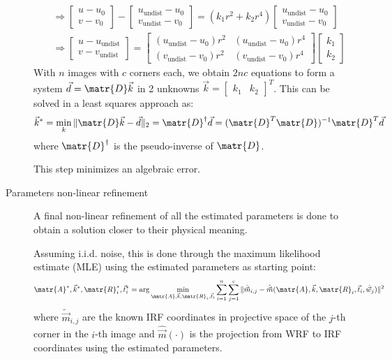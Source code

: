 \begin{description}
\[\begin{split}
                &\Rightarrow \begin{bmatrix} u-u_0 \\ v-v_0 \end{bmatrix} - \begin{bmatrix} u_\text{undist}-u_0 \\ v_\text{undist}-v_0 \end{bmatrix} = 
                    (k_1r^2 + k_2r^4) \begin{bmatrix} u_\text{undist}-u_0 \\ v_\text{undist}-v_0 \end{bmatrix} \\
                &\Rightarrow \begin{bmatrix} u-u_\text{undist} \\ v-v_\text{undist} \end{bmatrix} = 
                    \begin{bmatrix}
                        (u_\text{undist} - u_0)r^2 & (u_\text{undist} - u_0)r^4 \\
                        (v_\text{undist} - v_0)r^2 & (v_\text{undist} - v_0)r^4
                    \end{bmatrix}
                    \begin{bmatrix} k_1 \\ k_2 \end{bmatrix}
            \end{split}
        \]
        With $n$ images with $c$ corners each, we obtain $2nc$ equations 
        to form a system $\vec{d} = \matr{D} \vec{k}$ in 2 unknowns $\vec{k} = \begin{bmatrix} k_1 & k_2\end{bmatrix}^T$.
        This can be solved in a least squares approach as:
        \[ \vec{k}^*  = \min_k \Vert \matr{D}\vec{k} - \vec{d} \Vert_2 = \matr{D}^\dagger \vec{d} = (\matr{D}^T\matr{D})^{-1} \matr{D}^T \vec{d} \]
        where $\matr{D}^\dagger$ is the pseudo-inverse of $\matr{D}$.

        \begin{remark}
            This step minimizes an algebraic error.
        \end{remark}

    \item[Parameters non-linear refinement]
        A final non-linear refinement of all the estimated parameters is done to obtain a solution closer to their physical meaning.

        Assuming i.i.d. noise, this is done through the maximum likelihood estimate (MLE) using the estimated parameters as starting point:
        \[ 
            \matr{A}^*, \vec{k}^*, \matr{R}_i^*, \vec{t}_i^* = 
                \arg\min_{\matr{A}, \vec{k}, \matr{R}_i, \vec{t}_i} \sum_{i=1}^n \sum_{j=1}^c 
                    \Vert \tilde{\vec{m}}_{i,j} - \hat{\vec{m}}(\matr{A}, \vec{k}, \matr{R}_i, \vec{t}_i, \tilde{\vec{w}}_j) \Vert^2
        \]
        where $\tilde{\vec{m}}_{i,j}$ are the known IRF coordinates in projective space of the $j$-th corner in the $i$-th image and
        $\hat{\vec{m}}(\cdot)$ is the projection from WRF to IRF coordinates using the estimated parameters.


\end{description}
